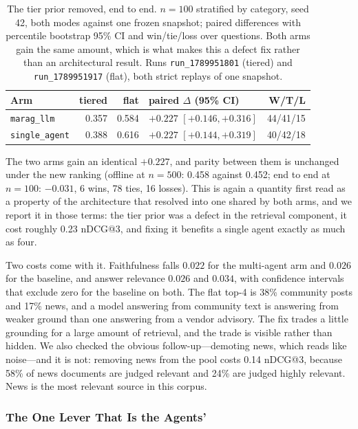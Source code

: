 \documentclass[acmsmall,review,anonymous,screen]{acmart}
\begin{document}
\begin{table}[t]
\caption{The tier prior removed, end to end. $n=100$ stratified by category,
seed 42, both modes against one frozen snapshot; paired differences with
percentile bootstrap 95\% CI and win/tie/loss over questions. Both arms gain
the same amount, which is what makes this a defect fix rather than an
architectural result. Runs \texttt{run\_1789951801} (tiered) and
\texttt{run\_1789951917} (flat), both strict replays of one snapshot.}
\label{tab:tier-e2e}
\begin{tabular}{lrrlr}
\toprule
Arm & tiered & flat & paired $\Delta$ (95\% CI) & W/T/L \\
\midrule
\texttt{marag\_llm}    & 0.357 & 0.584 & $+0.227$ $[+0.146, +0.316]$ & 44/41/15 \\
\texttt{single\_agent} & 0.388 & 0.616 & $+0.227$ $[+0.144, +0.319]$ & 40/42/18 \\
\bottomrule
\end{tabular}
\end{table}

The two arms gain an identical $+0.227$, and parity between them is unchanged
under the new ranking (offline at $n=500$: 0.458 against 0.452; end to end at
$n=100$: $-0.031$, 6 wins, 78 ties, 16 losses). This is again a quantity first read as a property of the
architecture that resolved into one shared by both arms, and we report it in
those terms: the tier prior
was a defect in the retrieval component, it cost roughly 0.23 nDCG@3, and
fixing it benefits a single agent exactly as much as four.

Two costs come with it. Faithfulness falls $0.022$ for the multi-agent arm and
$0.026$ for the baseline, and answer relevance $0.026$ and $0.034$, with
confidence intervals that exclude zero for the baseline on both. The flat
top-4 is 38\% community posts and 17\% news, and a model answering from
community text is answering from weaker ground than one answering from a
vendor advisory. The fix trades a little grounding for a large amount of
retrieval, and the trade is visible rather than hidden. We also checked the
obvious follow-up---demoting news, which reads like noise---and it is not:
removing news from the pool costs 0.14 nDCG@3, because 58\% of news documents
are judged relevant and 24\% are judged highly relevant. News is the most
relevant source in this corpus.

\subsubsection{The One Lever That Is the Agents'}
\end{document}
